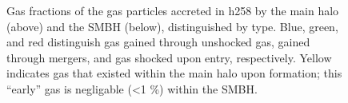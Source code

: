 \documentclass[manuscript]{aastex}
\begin{document}
\begin{figure}
\centerline{}
\centerline{}
\caption[]{Gas fractions of the gas particles accreted in h258 by the main halo (above) and the SMBH (below), distinguished by type. Blue, green, and red distinguish gas gained through unshocked gas, gained through mergers, and gas shocked upon entry, respectively. Yellow indicates gas that existed within the main halo upon formation; this ``early'' gas is negligable (<1 \%) within the SMBH.}
\label{h277piefrac} 
\end{figure}
\end{document}
